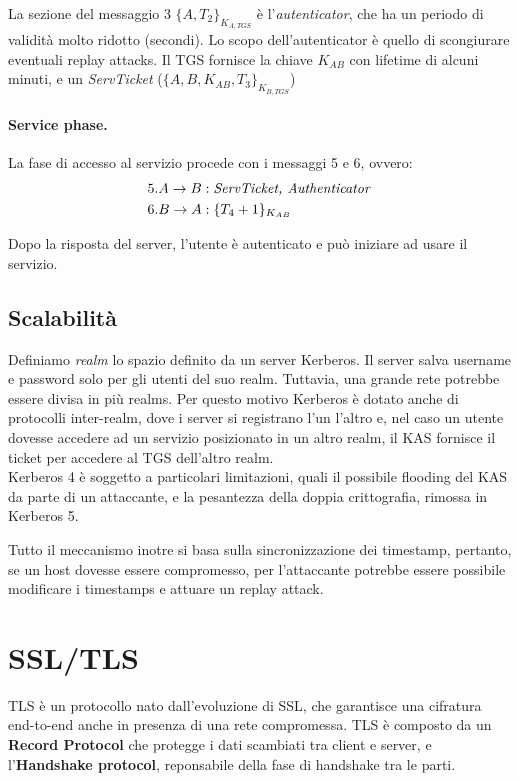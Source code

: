 \documentclass[a4paper, 10pt, twoside]{article}
\begin{document}
	La sezione del messaggio 3 $\lbrace A, T_2\rbrace_{K_{A, TGS}}$ è l'\textit{autenticator}, che ha un periodo di validità molto ridotto (secondi). Lo scopo dell'autenticator è quello di scongiurare eventuali replay attacks. Il TGS fornisce la chiave $K_{AB}$ con lifetime di alcuni minuti, e un \textit{ServTicket} ($\lbrace A, B, K_{AB}, T_3\rbrace_{K_{B, TGS}}$)

	\paragraph{Service phase.} La fase di accesso al servizio procede con i messaggi 5 e 6, ovvero: \begin{align*}
		5. A \to B&: \text{\textit{ServTicket, Authenticator}}\\
		6. B \to A&: \lbrace T_4 + 1\rbrace_{K_{AB}}
	\end{align*}

	Dopo la risposta del server, l'utente è autenticato e può iniziare ad usare il servizio.

	\subsection{Scalabilità}
	Definiamo \textit{realm} lo spazio definito da un server Kerberos. Il server salva username e password solo per gli utenti del suo realm. Tuttavia, una grande rete potrebbe essere divisa in più realms. Per questo motivo Kerberos è dotato anche di protocolli inter-realm, dove i server si registrano l'un l'altro e, nel caso un utente dovesse accedere ad un servizio posizionato in un altro realm, il KAS fornisce il ticket per accedere al TGS dell'altro realm. \\

	Kerberos 4 è soggetto a particolari limitazioni, quali il possibile flooding del KAS da parte di un attaccante, e la pesantezza della doppia crittografia, rimossa in Kerberos 5.

	Tutto il meccanismo inotre si basa sulla sincronizzazione dei timestamp, pertanto, se un host dovesse essere compromesso, per l'attaccante potrebbe essere possibile modificare i timestamps e attuare un replay attack.

	\section{SSL/TLS}
	TLS è un protocollo nato dall'evoluzione di SSL, che garantisce una cifratura end-to-end anche in presenza di una rete compromessa. TLS è composto da un \textbf{Record Protocol} che protegge i dati scambiati tra client e server, e l'\textbf{Handshake protocol}, reponsabile della fase di handshake tra le parti.
\end{document}

